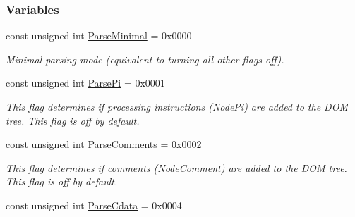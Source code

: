 \subsubsection*{Variables}
\begin{DoxyCompactItemize}
\item 
const unsigned int \hyperlink{namespacephys_1_1xml_ab660837afbc6aaab22425d8d23e8f2e4}{ParseMinimal} = 0x0000
\begin{DoxyCompactList}\small\item\em Minimal parsing mode (equivalent to turning all other flags off). \item\end{DoxyCompactList}\item 
\hypertarget{namespacephys_1_1xml_a4d324954fc33d50155bae04587da13e2}{
const unsigned int \hyperlink{namespacephys_1_1xml_a4d324954fc33d50155bae04587da13e2}{ParsePi} = 0x0001}
\label{d9/d27/namespacephys_1_1xml_a4d324954fc33d50155bae04587da13e2}

\begin{DoxyCompactList}\small\item\em This flag determines if processing instructions (NodePi) are added to the DOM tree. This flag is off by default. \item\end{DoxyCompactList}\item 
\hypertarget{namespacephys_1_1xml_a83ba30a7bee5a0fd4aa2f6136c8793fc}{
const unsigned int \hyperlink{namespacephys_1_1xml_a83ba30a7bee5a0fd4aa2f6136c8793fc}{ParseComments} = 0x0002}
\label{d9/d27/namespacephys_1_1xml_a83ba30a7bee5a0fd4aa2f6136c8793fc}

\begin{DoxyCompactList}\small\item\em This flag determines if comments (NodeComment) are added to the DOM tree. This flag is off by default. \item\end{DoxyCompactList}\item 
\hypertarget{namespacephys_1_1xml_aec00a2a16700dfd76f8f3c776bd000ac}{
const unsigned int \hyperlink{namespacephys_1_1xml_aec00a2a16700dfd76f8f3c776bd000ac}{ParseCdata} = 0x0004}
\label{d9/d27/namespacephys_1_1xml_aec00a2a16700dfd76f8f3c776bd000ac}


\end{DoxyCompactItemize}
